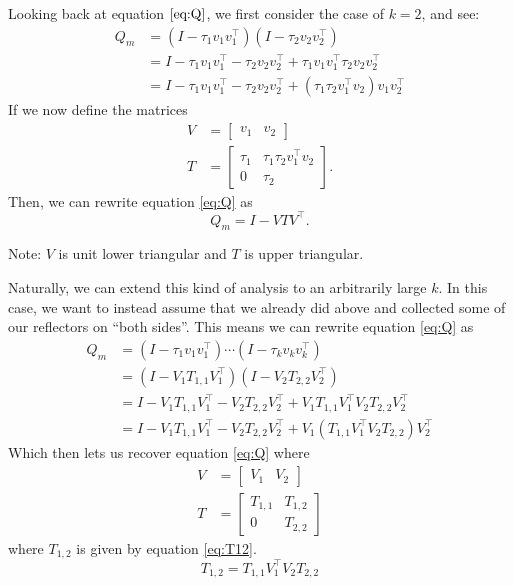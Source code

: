 \documentclass[12pt]{article}
\begin{document}
    Looking back at equation $\ref{eq:Q}$, we first consider the case of $k=2$, and see:
    \begin{align*}
        Q_m &= \left(I - \tau_1v_1v_1^\top\right)\left(I - \tau_2v_2v_2^\top\right) \\
            &= I - \tau_1v_1v_1^\top - \tau_2v_2v_2^\top + \tau_1v_1v_1^\top\tau_2v_2v_2^\top \\
            &= I - \tau_1v_1v_1^\top - \tau_2v_2v_2^\top + \left(\tau_1\tau_2v_1^\top v_2\right)v_1v_2^\top
    \end{align*}
    If we now define the matrices
    \begin{align*}
        V &= \begin{bmatrix} v_1 & v_2 \end{bmatrix} \\
            T &= \begin{bmatrix} \tau_1 & \tau_1\tau_2v_1^\top v_2 \\
            0 & \tau_2\end{bmatrix}.
    \end{align*}
    Then, we can rewrite equation \ref{eq:Q} as 
    \begin{equation}\label{eq:blockedQ}
        Q_m = I - VTV^\top.
    \end{equation}

    Note: $V$ is unit lower triangular and $T$ is upper triangular.

    Naturally, we can extend this kind of analysis to an arbitrarily large $k$. In this case, we want to
    instead assume that we already did above and collected some of our reflectors on ``both sides''. This means
    we can rewrite equation \ref{eq:Q} as
    \begin{align*}
        Q_m &= \left(I-\tau_1v_1v_1^\top\right)\cdots\left(I-\tau_kv_kv_k^\top\right) \\
            &= \left(I - V_1T_{1,1}V_1^\top\right)\left(I - V_2T_{2,2}V_2^\top\right) \\
            &= I - V_1T_{1,1}V_1^\top - V_2T_{2,2}V_2^\top + V_1T_{1,1}V_1^\top V_2T_{2,2}V_2^\top \\
            &= I - V_1T_{1,1}V_1^\top - V_2T_{2,2}V_2^\top + V_1\left(T_{1,1}V_1^\top V_2T_{2,2}\right)V_2^\top
    \end{align*}
    Which then lets us recover equation \ref{eq:Q} where
    \begin{align}
        V &= \begin{bmatrix} V_1 & V_2 \end{bmatrix} \label{eq:vMat} \\
        T &= \begin{bmatrix} T_{1,1} & T_{1,2} \\
        0 & T_{2,2}\end{bmatrix} \label{eq:tMat}
    \end{align}
    where $T_{1,2}$ is given by equation \ref{eq:T12}.
    \begin{equation}\label{eq:T12}
        T_{1,2} = T_{1,1}V_1^\top V_2T_{2,2}
    \end{equation}
\end{document}
